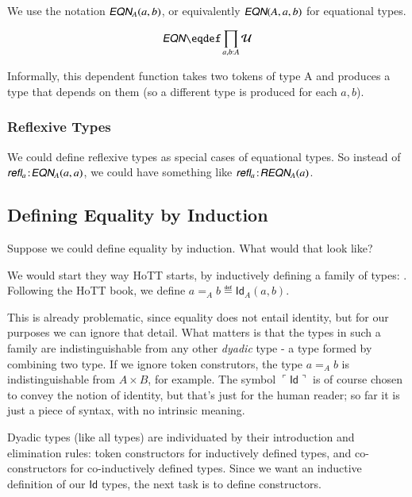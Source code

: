 \documentclass{article}
\begin{document}
We use the notation \(\EQN_A(a,b)\), or equivalently \(\EQN(A,a,b)\)
for equational types.

\[\EQN \defeq \prod\limits_{\tjsmall{a,b}{A}}\Univ\]



Informally, this dependent function takes two tokens of type A and
produces a type that depends on them (so a different type is produced
for each \(a,b\)).

\subsubsection{Reflexive Types}

We could define reflexive types as special cases of equational types.
So instead of \( \tj{\refl_a}{\EQN_A(a,a)}\), we could have something like
\(\tj{\refl_a}{\REQN_A(a)}\).


\subsection{Defining Equality by Induction}

Suppose we could define equality by induction. What would that look
like?

We would start they way HoTT starts, by inductively defining a family
of types: . Following the HoTT book, we define
\(a=_Ab\eqdef\textsf{Id}_A(a,b)\).

This is already problematic, since equality does not entail identity,
but for our purposes we can ignore that detail. What matters is that
the types in such a family are indistinguishable from any other
\textit{dyadic} type - a type formed by combining two type. If we
ignore token construtors, the type \(a=_Ab\) is indistinguishable from
\(A\times B\), for example. The symbol
\(\ulcorner\textsf{Id}\urcorner\) is of course chosen to convey the
notion of identity, but that's just for the human reader; so far it is
just a piece of syntax, with no intrinsic meaning.

Dyadic types (like all types) are individuated by their introduction
and elimination rules: token constructors for inductively defined
types, and co-constructors for co-inductively defined types. Since we
want an inductive definition of our \(\textsf{Id}\) types, the next
task is to define constructors.
\end{document}
